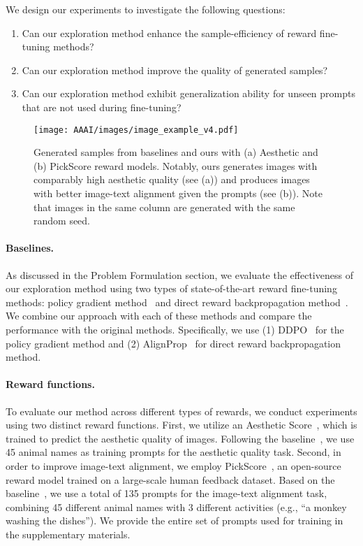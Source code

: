 We design our experiments to investigate the following questions:
\begin{enumerate}
    \item Can our exploration method enhance the sample-efficiency of reward fine-tuning methods?
    \item Can our exploration method improve the quality of generated samples?
    \item Can our exploration method exhibit generalization ability for unseen prompts that are not used during fine-tuning? 
\end{enumerate}

\begin{figure*}[!t]
  \centering
  \texttt{[image: AAAI/images/image\_example\_v4.pdf]}
  \caption{Generated samples from baselines and ours with (a) Aesthetic and (b) PickScore reward models. Notably, ours generates images with comparably high aesthetic quality (see (a)) and produces images with better image-text alignment given the prompts (see (b)). Note that images in the same column are generated with the same random seed. 
  }
  \label{fig:sample_quality}
\end{figure*}

\paragraph{Baselines.}
As discussed in the Problem Formulation section, we evaluate the effectiveness of our exploration method using two types of state-of-the-art reward fine-tuning methods: policy gradient method~\cite{dpok,ddpo} and direct reward backpropagation method~\cite{draft,alignprop}. We combine our approach with each of these methods and compare the performance with the original methods. Specifically, we use (1) DDPO~\cite{ddpo} for the policy gradient method and (2) AlignProp~\cite{alignprop} for direct reward backpropagation method.

\paragraph{Reward functions.}
To evaluate our method across different types of rewards, we conduct experiments using two distinct reward functions. First, we utilize an Aesthetic Score~\cite{aesthetic}, which is trained to predict the aesthetic quality of images. Following the baseline~\cite{ddpo, alignprop}, we use 45 animal names as training prompts for the aesthetic quality task. Second, in order to improve image-text alignment, we employ PickScore~\cite{pickscore}, an open-source reward model trained on a large-scale human feedback dataset. Based on the baseline~\cite{ddpo}, we use a total of 135 prompts for the image-text alignment task, combining 45 different animal names with 3 different activities (e.g., ``a monkey washing the dishes''). We provide the entire set of prompts used for training in the supplementary materials.

